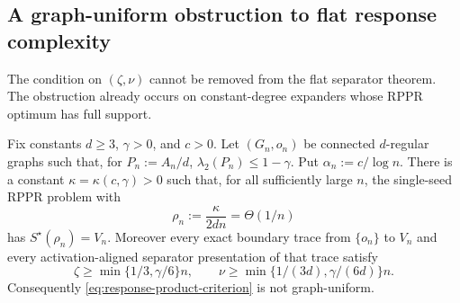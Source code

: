 \subsection{A graph-uniform obstruction to flat response complexity}
\label{sec:expander-response-obstruction}

The condition on $(\zeta,\nu)$ cannot be removed from the flat separator
theorem.  The obstruction already occurs on constant-degree expanders whose
RPPR optimum has full support.

\begin{proposition}
\label{prop:expander-response-obstruction}
Fix constants $d\geq3$, $\gamma>0$, and $c>0$.  Let $(G_n,o_n)$ be connected
$d$-regular graphs such that, for $P_n:=A_n/d$,
$\lambda_2(P_n)\leq1-\gamma$.  Put $\alpha_n:=c/\log n$.  There is a constant
$\kappa=\kappa(c,\gamma)>0$ such that, for all sufficiently large $n$, the
single-seed RPPR problem with
\begin{equation}
 \rho_n:=\frac{\kappa}{2dn}=\Theta(1/n)
 \label{eq:expander-rho}
\end{equation}
has $S^\star(\rho_n)=V_n$.  Moreover every exact boundary trace from
$\{o_n\}$ to $V_n$ and every activation-aligned separator presentation of
that trace satisfy
\begin{equation}
 \zeta\geq\min\{1/3,\gamma/6\}n,
 \qquad
 \nu\geq\min\{1/(3d),\gamma/(6d)\}n.
 \label{eq:expander-response-lower-bound}
\end{equation}
Consequently \cref{eq:response-product-criterion} is not graph-uniform.
\end{proposition}

